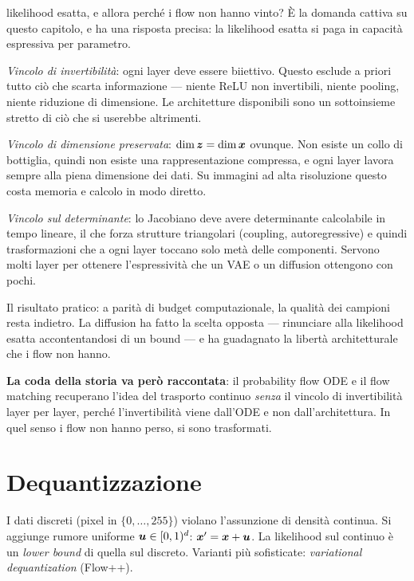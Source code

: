 \begin{trappola}{likelihood esatta, e allora perché i flow non hanno vinto?}
È la domanda cattiva su questo capitolo, e ha una risposta precisa: la likelihood esatta si paga in capacità espressiva per parametro.

\emph{Vincolo di invertibilità}: ogni layer deve essere biiettivo. Questo esclude a priori tutto ciò che scarta informazione — niente ReLU non invertibili, niente pooling, niente riduzione di dimensione. Le architetture disponibili sono un sottoinsieme stretto di ciò che si userebbe altrimenti.

\emph{Vincolo di dimensione preservata}: $\dim \bm{z} = \dim \bm{x}$ ovunque. Non esiste un collo di bottiglia, quindi non esiste una rappresentazione compressa, e ogni layer lavora sempre alla piena dimensione dei dati. Su immagini ad alta risoluzione questo costa memoria e calcolo in modo diretto.

\emph{Vincolo sul determinante}: lo Jacobiano deve avere determinante calcolabile in tempo lineare, il che forza strutture triangolari (coupling, autoregressive) e quindi trasformazioni che a ogni layer toccano solo metà delle componenti. Servono molti layer per ottenere l'espressività che un VAE o un diffusion ottengono con pochi.

Il risultato pratico: a parità di budget computazionale, la qualità dei campioni resta indietro. La diffusion ha fatto la scelta opposta — rinunciare alla likelihood esatta accontentandosi di un bound — e ha guadagnato la libertà architetturale che i flow non hanno.

\textbf{La coda della storia va però raccontata}: il probability flow ODE e il flow matching recuperano l'idea del trasporto continuo \emph{senza} il vincolo di invertibilità layer per layer, perché l'invertibilità viene dall'ODE e non dall'architettura. In quel senso i flow non hanno perso, si sono trasformati.
\end{trappola}

\section{Dequantizzazione}

I dati discreti (pixel in $\{0,\dots,255\}$) violano l'assunzione di densità continua. Si aggiunge rumore uniforme $\bm{u} \in [0,1)^d$: $\bm{x}' = \bm{x} + \bm{u}$. La likelihood sul continuo è un \emph{lower bound} di quella sul discreto. Varianti più sofisticate: \emph{variational dequantization} (Flow++).

